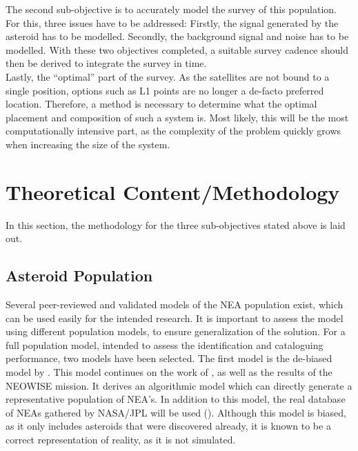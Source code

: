 \documentclass[12pt, english, NoHyper]{AE4010-template}
\begin{document}
The second sub-objective is to accurately model the survey of this population. For this, three issues have to be addressed: Firstly, the signal generated by the asteroid has to be modelled. Secondly, the background signal and noise has to be modelled. With these two objectives completed, a suitable survey cadence should then be derived to integrate the survey in time.\\

Lastly, the ``optimal'' part of the survey. As the satellites are not bound to a single position, options such as L1 points are no longer a de-facto preferred location. Therefore, a method is necessary to determine what the optimal placement and composition of such a system is. Most likely, this will be the most computationally intensive part, as the complexity of the problem quickly grows when increasing the size of the system.

\section{Theoretical Content/Methodology}
In this section, the methodology for the three sub-objectives stated above is laid out.

\subsection{Asteroid Population}
Several peer-reviewed and validated models of the NEA population exist, which can be used easily for the intended research. It is important to assess the model using different population models, to ensure generalization of the solution. For a full population model, intended to assess the identification and cataloguing performance, two models have been selected. The first model is the de-biased model by \cite{PopulationGranvik}. This model continues on the work of \cite{PopulationHarris}, as well as the results of the NEOWISE mission. It derives an algorithmic model which can directly generate a representative population of NEA's. In addition to this model, the real database of NEAs gathered by NASA/JPL will be used (\cite{CNEOSDatabase}). Although this model is biased, as it only includes asteroids that were discovered already, it is known to be a correct representation of reality, as it is not simulated.\\
\end{document}
